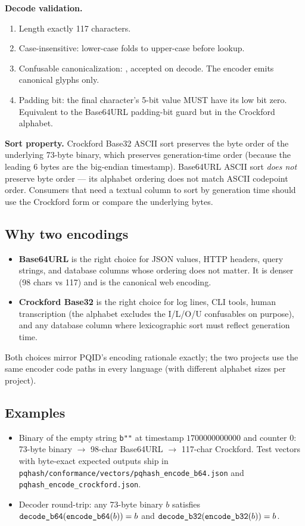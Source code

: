 \textbf{Decode validation.}
\begin{enumerate}
  \item Length exactly 117 characters.
  \item Case-insensitive: lower-case folds to upper-case before lookup.
  \item Confusable canonicalization: ,  accepted on decode. The encoder emits canonical glyphs only.
  \item Padding bit: the final character's 5-bit value MUST have its low bit zero. Equivalent to the Base64URL padding-bit guard but in the Crockford alphabet.
\end{enumerate}

\textbf{Sort property.} Crockford Base32 ASCII sort preserves the byte order of the underlying 73-byte binary, which preserves generation-time order (because the leading 6 bytes are the big-endian timestamp). Base64URL ASCII sort \emph{does not} preserve byte order --- its alphabet ordering does not match ASCII codepoint order. Consumers that need a textual column to sort by generation time should use the Crockford form or compare the underlying bytes.

\subsection{Why two encodings}

\begin{itemize}
  \item \textbf{Base64URL} is the right choice for JSON values, HTTP headers, query strings, and database columns whose ordering does not matter. It is denser (98 chars vs 117) and is the canonical web encoding.
  \item \textbf{Crockford Base32} is the right choice for log lines, CLI tools, human transcription (the alphabet excludes the I/L/O/U confusables on purpose), and any database column where lexicographic sort must reflect generation time.
\end{itemize}

Both choices mirror PQID's encoding rationale exactly; the two projects use the same encoder code paths in every language (with different alphabet sizes per project).

\subsection{Examples}

\begin{itemize}
\item Binary \pqhash{} of the empty string \texttt{b""} at timestamp $1700000000000$ and counter $0$:\\
73-byte binary $\to$ 98-char Base64URL $\to$ 117-char Crockford. Test vectors with byte-exact expected outputs ship in \texttt{pqhash/conformance/vectors/pqhash\_encode\_b64.json} and \texttt{pqhash\_encode\_crockford.json}.
\item Decoder round-trip: any 73-byte binary $b$ satisfies $\texttt{decode\_b64}(\texttt{encode\_b64}(b)) = b$ and $\texttt{decode\_b32}(\texttt{encode\_b32}(b)) = b$.
\end{itemize}
